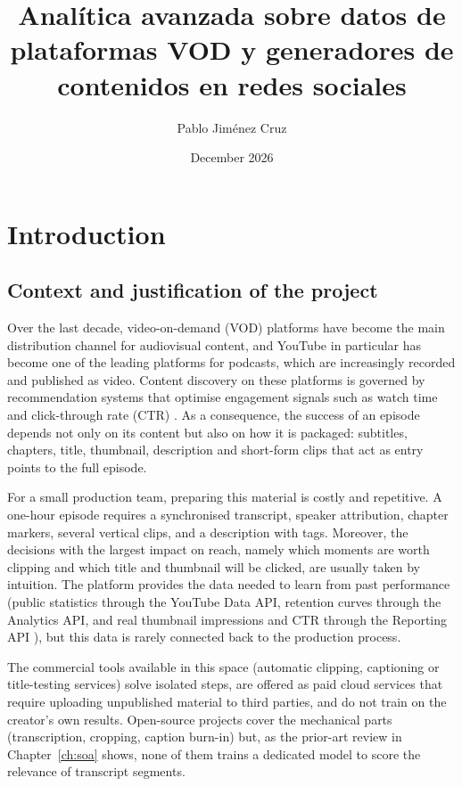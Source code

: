 \documentclass[ENG]{TFUOC}
\title{Analítica avanzada sobre datos de plataformas VOD y generadores de contenidos en redes sociales}
\author{Pablo Jiménez Cruz}
\date{December 2026}
\begin{document}
\estructura

\tableofcontents

\listoffigures

\listoftables


\chapter{Introduction}

\section{Context and justification of the project}

Over the last decade, video-on-demand (VOD) platforms have become the main distribution channel for audiovisual content, and YouTube in particular has become one of the leading platforms for podcasts, which are increasingly recorded and published as video. Content discovery on these platforms is governed by recommendation systems that optimise engagement signals such as watch time and click-through rate (CTR) \cite{recommender_systems_streaming, vod_bigdata}. As a consequence, the success of an episode depends not only on its content but also on how it is packaged: subtitles, chapters, title, thumbnail, description and short-form clips that act as entry points to the full episode.

For a small production team, preparing this material is costly and repetitive. A one-hour episode requires a synchronised transcript, speaker attribution, chapter markers, several vertical clips, and a description with tags. Moreover, the decisions with the largest impact on reach, namely which moments are worth clipping and which title and thumbnail will be clicked, are usually taken by intuition. The platform provides the data needed to learn from past performance (public statistics through the YouTube Data API, retention curves through the Analytics API, and real thumbnail impressions and CTR through the Reporting API \cite{yt_data_api}), but this data is rarely connected back to the production process.

The commercial tools available in this space (automatic clipping, captioning or title-testing services) solve isolated steps, are offered as paid cloud services that require uploading unpublished material to third parties, and do not train on the creator's own results. Open-source projects cover the mechanical parts (transcription, cropping, caption burn-in) but, as the prior-art review in Chapter~\ref{ch:soa} shows, none of them trains a dedicated model to score the relevance of transcript segments.
\end{document}
